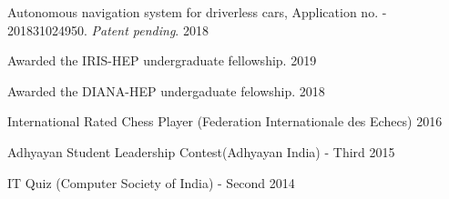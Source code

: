 \documentclass[10pt, letterpaper]{deps1}
\begin{document}
%
%
\small{\begin{tightitemize}
    \item Autonomous navigation system for driverless cars, Application no. - 201831024950. {\textit{Patent pending}}. \hfill{2018}
\end{tightitemize}}

%
%
\begin{tightitemize}
    \item Awarded the IRIS-HEP undergraduate fellowship. \hfill{2019}
	\item Awarded the DIANA-HEP undergaduate felowship. \hfill{2018}
	\item International Rated Chess Player (Federation Internationale des Echecs) \hfill{2016}
	\item Adhyayan Student Leadership Contest(Adhyayan India) - Third \hfill{2015}
	\item IT Quiz (Computer Society of India) - Second \hfill{2014}
\end{tightitemize}
\end{document}
